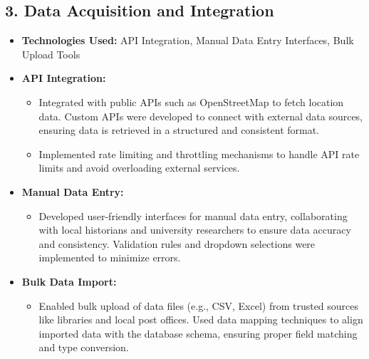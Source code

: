 \subsection{3. Data Acquisition and Integration}
\begin{itemize}
    \item \textbf{Technologies Used:} API Integration, Manual Data Entry Interfaces, Bulk Upload Tools
    \item \textbf{API Integration:}
        \begin{itemize}
            \item Integrated with public APIs such as OpenStreetMap to fetch location data. Custom APIs were developed to connect with external data sources, ensuring data is retrieved in a structured and consistent format.
            \item Implemented rate limiting and throttling mechanisms to handle API rate limits and avoid overloading external services.
        \end{itemize}
    \item \textbf{Manual Data Entry:}
        \begin{itemize}
            \item Developed user-friendly interfaces for manual data entry, collaborating with local historians and university researchers to ensure data accuracy and consistency. Validation rules and dropdown selections were implemented to minimize errors.
        \end{itemize}
    \item \textbf{Bulk Data Import:}
        \begin{itemize}
            \item Enabled bulk upload of data files (e.g., CSV, Excel) from trusted sources like libraries and local post offices. Used data mapping techniques to align imported data with the database schema, ensuring proper field matching and type conversion.
        \end{itemize}
\end{itemize}

